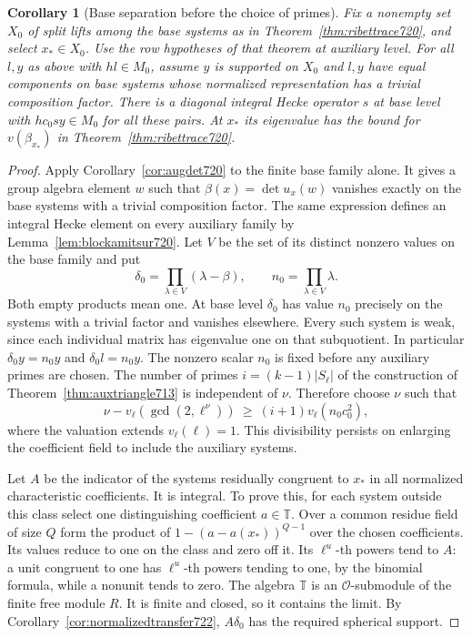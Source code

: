\documentclass[a4paper,11pt]{article}
\newtheorem{corollary}[proposition]{Corollary}
\theoremstyle{definition}
\theoremstyle{remark}
\numberwithin{equation}{section}
\begin{document}
\begin{corollary}[Base separation before the choice of primes]
\leavevmode\label{cor:baseseparation723}
Fix a nonempty set \(X_0\) of split lifts among the base systems
as in Theorem~\ref{thm:ribettrace720}, and select \(x_*\in X_0\).
Use the row hypotheses of that theorem at auxiliary level.
For all \(l,y\) as above with \(hl\in M_0\), assume \(y\) is
supported on \(X_0\) and \(l,y\) have equal components on base
systems whose normalized representation has a trivial
composition factor. There is a diagonal integral Hecke operator
\(s\) at base level with \(hc_0s y\in M_0\) for all these
pairs. At \(x_*\) its eigenvalue has the bound for
\(v(\beta_{x_*})\) in Theorem~\ref{thm:ribettrace720}.
\end{corollary}
\begin{proof}
Apply Corollary~\ref{cor:augdet720} to the finite base family
alone. It gives a group algebra element \(w\) such that
\(\beta(x)=\det u_x(w)\) vanishes exactly on the base systems
with a trivial composition factor. The same expression defines
an integral Hecke element on every auxiliary family by
Lemma~\ref{lem:blockamitsur720}. Let \(V\) be the set of its
distinct nonzero values on the base family and put
\[
    \delta_0=\prod_{\lambda\in V}(\lambda-\beta),\qquad
    n_0=\prod_{\lambda\in V}\lambda .
\]
Both empty products mean one. At base level \(\delta_0\) has
value \(n_0\) precisely on the systems with a trivial factor
and vanishes elsewhere. Every such system is weak, since each
individual matrix has eigenvalue one on that subquotient.
In particular \(\delta_0y=n_0y\) and \(\delta_0l=n_0y\).
The nonzero scalar \(n_0\) is fixed before any auxiliary primes
are chosen. The number of primes \(i=(k-1)|S_\ell|\) of the
construction of Theorem~\ref{thm:auxtriangle713} is independent
of \(\nu\). Therefore choose \(\nu\) such that
\[
       \nu-v_\ell(\gcd(2,\ell^\nu))
           \ \ge\ (i+1)v_\ell(n_0c_0^2),
\]
where the valuation extends \(v_\ell(\ell)=1\). This divisibility
persists on enlarging the coefficient field to include the
auxiliary systems.

Let \(A\) be the indicator of the systems residually congruent
to \(x_*\) in all normalized characteristic coefficients.
It is integral. To prove this, for each system outside this
class select one distinguishing coefficient \(a\in\mathbb T\).
Over a common residue field of size \(Q\) form the product of
\(1-(a-a(x_*))^{Q-1}\) over the chosen coefficients. Its
values reduce to one on the class and zero off it. Its
\(\ell^u\)-th powers tend to \(A\): a unit congruent to one
has \(\ell^u\)-th powers tending to one, by the binomial
formula, while a nonunit tends to zero. The algebra \(\mathbb T\)
is an \(\mathcal O\)-submodule of the finite free module \(R\).
It is finite and closed, so it contains the limit. By
Corollary~\ref{cor:normalizedtransfer722}, \(A\delta_0\)
has the required spherical support.


\end{proof}
\end{document}
